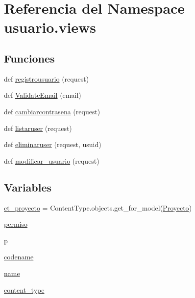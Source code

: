 \hypertarget{namespaceusuario_1_1views}{}\section{Referencia del Namespace usuario.\+views}
\label{namespaceusuario_1_1views}
\subsection*{Funciones}
\begin{DoxyCompactItemize}
\item 
def \hyperlink{namespaceusuario_1_1views_a3a696649b1a5dee50690bd74484d03f7}{registrousuario} (request)
\item 
def \hyperlink{namespaceusuario_1_1views_a7f223bba6a608a3d766fde36feaadde0}{Validate\+Email} (email)
\item 
def \hyperlink{namespaceusuario_1_1views_aea38fe57150e943bb6d5491afb6469d3}{cambiarcontrasena} (request)
\item 
def \hyperlink{namespaceusuario_1_1views_a0db98f64c23eb4d8108c3dbd2479c96c}{listaruser} (request)
\item 
def \hyperlink{namespaceusuario_1_1views_a5dde06470e472a111dfeb03e0c0b08e9}{eliminaruser} (request, usuid)
\item 
def \hyperlink{namespaceusuario_1_1views_aff4db369521f4fbe56177e05793a325a}{modificar\+\_\+usuario} (request)
\end{DoxyCompactItemize}
\subsection*{Variables}
\begin{DoxyCompactItemize}
\item 
\hyperlink{namespaceusuario_1_1views_a592da1d9867c21c536be49a1ab5b7361}{ct\+\_\+proyecto} = Content\+Type.\+objects.\+get\+\_\+for\+\_\+model(\hyperlink{classproyectos_1_1models_1_1_proyecto}{Proyecto})
\item 
\hyperlink{namespaceusuario_1_1views_a68d770ef541ea63e90a73d98640c60dc}{permiso}
\item 
\hyperlink{namespaceusuario_1_1views_a9c613e5b69ad136aac1d7051827b9969}{p}
\item 
\hyperlink{namespaceusuario_1_1views_ab881852337137a8832523599f2b3da69}{codename}
\item 
\hyperlink{namespaceusuario_1_1views_a23bd2b0f3efef86a7657aedbbb7a4b3a}{name}
\item 
\hyperlink{namespaceusuario_1_1views_aef6a1060a6b410adfb273991886184cf}{content\+\_\+type}
\end{DoxyCompactItemize}


